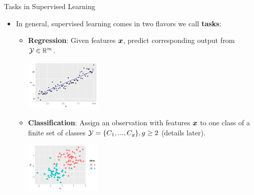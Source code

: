 \documentclass[11pt,compress,t,notes=noshow, xcolor=table]{beamer}
\begin{document}
\begin{vbframe}{Tasks in Supervised Learning}

\begin{itemize}

  \item In general, supervised learning comes in two flavors we call 
  \textbf{tasks}:
  
  \begin{itemize}
  
    \item \textbf{Regression}: Given features $\bm{x}$, predict corresponding 
    output from $\mathcal{Y} \in \mathbb{R}^m$.
    
    \begin{center}
      \includegraphics[width = 0.3\textwidth]{figure_man/ml-basics-supervised-regression-task.png} 
    \end{center}
    
    \item \textbf{Classification}: Assign an observation with features $\bm{x}$ to 
    one class of a finite set of classes $\mathcal{Y} = \{C_1,...,C_g\}, g \geq 2$
    (details later).
    
    \begin{center}
      \includegraphics[width = 0.3\textwidth]{figure_man/ml-basics-supervised-classif-task.png} 
    \end{center}

  \end{itemize}
  
\end{itemize}  

\end{vbframe}

\end{document}
